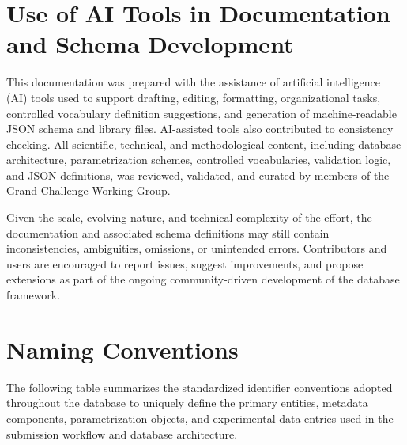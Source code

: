 \documentclass[11pt]{book}
\begin{document}
\section{Use of AI Tools in Documentation and Schema Development}
This documentation was prepared with the assistance of artificial intelligence (AI) tools used to support drafting, editing, formatting, organizational tasks, controlled vocabulary definition suggestions, and generation of machine-readable JSON schema and library files. AI-assisted tools also contributed to consistency checking. All scientific, technical, and methodological content, including database architecture, parametrization schemes, controlled vocabularies, validation logic, and JSON definitions, was reviewed, validated, and curated by members of the Grand Challenge Working Group.

Given the scale, evolving nature, and technical complexity of the effort, the documentation and associated schema definitions may still contain inconsistencies, ambiguities, omissions, or unintended errors. Contributors and users are encouraged to report issues, suggest improvements, and propose extensions as part of the ongoing community-driven development of the database framework.


\section{Naming Conventions}

The following table summarizes the standardized identifier conventions adopted throughout the database to uniquely define the primary entities, metadata components, parametrization objects, and experimental data entries used in the submission workflow and database architecture.
\end{document}
